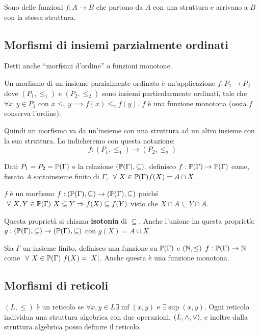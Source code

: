 Sono delle funzioni $f : A \to B$ che partono da $A$ con una struttura e arrivano a $B$ con la stessa struttura.

\subsection{Morfismi di insiemi parzialmente ordinati}

Detti anche ``morfismi d'ordine'' o funzioni monotone. 
\begin{defn}
Un morfismo di un insieme parzialmente ordinato \`e un'applicazione $f : P_1 \to P_2$ dove $(P_1, \le_{1})$ e $(P_2, \le_{2})$ sono insiemi particolarmente ordinati, tale che $\forall x, y \in P_1$ con $x \le_1 y \implies f(x) \le_2 f(y)$. $f$ \`e una funzione monotona (ossia $f$ conserva l'ordine). 
\end{defn}
Quindi un morfismo va da un'insieme con una struttura ad un altro insieme con la sua struttura. Lo indicheremo con questa notazione:
\[
f : (P_1, \le_{1}) \to (P_2, \le_{2})
\]
\begin{exmp}
Dati $P_1 = P_2 = \mathbb{P}(\Gamma)$ e la relazione $(\mathbb{P}(\Gamma), \subseteq)$, definisco $f : \mathbb{P}(\Gamma) \to \mathbb{P}(\Gamma)$ come, fissato $A$ sottoinsieme finito di $\Gamma$, $\forall X \in \parts(\Gamma) f(X) = A \cap X$.

$f$ \`e un morfismo $f : (\mathbb{P}(\Gamma), \subseteq) \to (\mathbb{P}(\Gamma), \subseteq)$ poich\'e $\forall X, Y \in \parts(\Gamma) \ X \subseteq Y \implies f(X) \subseteq f(Y)$ visto che $X \cap A \subseteq Y \cap A$.
\end{exmp}
Questa propriet\`a si chiama \textbf{isotonia} di $\subseteq$. Anche l'unione ha questa propriet\`a: $g : (\mathbb{P}(\Gamma), \subseteq) \to (\mathbb{P}(\Gamma), \subseteq)$ con $g(X) = A \cup X$

\begin{exmp}
Sia $\Gamma$ un insieme finito, definisco una funzione su $\mathbb{P}(\Gamma)$ e $(\mathbb{N}, \le)$ $f : \mathbb{P}(\Gamma) \to \mathbb{N}$ come $\forall X \in \parts(\Gamma) \ f(X) = \abs{X}$. Anche questa \`e una funzione monotona.
\end{exmp}

\subsection{Morfismi di reticoli}

$(L, \le)$ \`e un reticolo se $\forall x, y \in L \exists \inf(x, y) $ e $ \exists \sup(x,y)$. Ogni reticolo individua una struttura algebrica con due operazioni, $(L, \wedge, \vee)$, e inoltre dalla struttura algebrica posso definire il reticolo.

